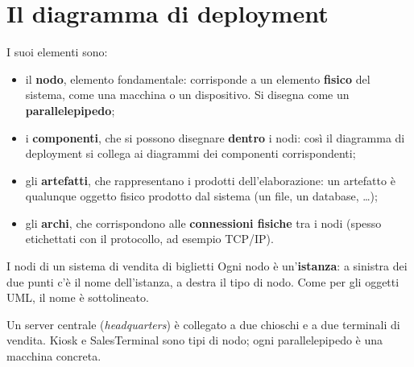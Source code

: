\section{Il diagramma di deployment}


I suoi elementi sono:
\begin{itemize}
  \item il \textbf{nodo}, elemento fondamentale: corrisponde a un elemento \textbf{fisico} del sistema, come una macchina o un
        dispositivo. Si disegna come un \textbf{parallelepipedo};
  \item i \textbf{componenti}, che si possono disegnare \textbf{dentro} i nodi: così il diagramma di deployment si collega ai
        diagrammi dei componenti corrispondenti;
  \item gli \textbf{artefatti}, che rappresentano i prodotti dell'elaborazione: un artefatto è qualunque oggetto fisico prodotto
        dal sistema (un file, un database, \ldots);
  \item gli \textbf{archi}, che corrispondono alle \textbf{connessioni fisiche} tra i nodi (spesso etichettati con il protocollo, ad
        esempio TCP/IP).
\end{itemize}

\begin{esempio}{I nodi di un sistema di vendita di biglietti}
Ogni nodo è un'\textbf{istanza}: a sinistra dei due punti c'è il nome dell'istanza, a destra il tipo di nodo. Come per gli oggetti
UML, il nome è sottolineato.
\begin{center}
\end{center}
Un server centrale (\textit{headquarters}) è collegato a due chioschi e a due terminali di vendita. Kiosk e SalesTerminal
sono tipi di nodo; ogni parallelepipedo è una macchina concreta.
\end{esempio}

